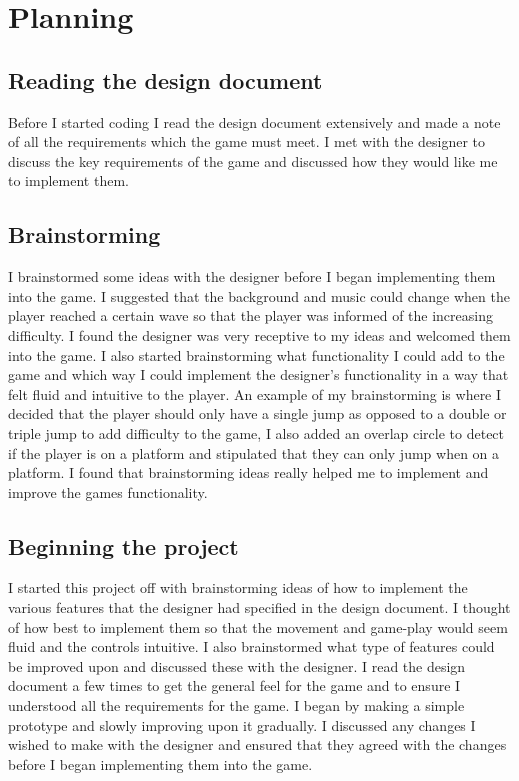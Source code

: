 \documentclass{report}
\begin{document}
\chapter{Planning}
\section{Reading the design document}
Before I started coding I read the design document extensively and made a note of all the requirements which the game must meet.  I met with the designer to discuss the key requirements of the game and discussed how they would like me to implement them.
\section{Brainstorming}
I brainstormed some ideas with the designer before I began implementing them into the game.  I suggested that the background and music could change when the player reached a certain wave so that the player was informed of the increasing difficulty.  I found the designer was very receptive to my ideas and welcomed them into the game. I also started brainstorming what functionality I could add to the game and which way I could implement the designer's functionality in a way that felt fluid and intuitive to the player.  An example of my brainstorming is where I decided that the player should only have a single jump as opposed to a double or triple jump to add difficulty to the game, I also added an overlap circle to detect if the player is on a platform and stipulated that they can only jump when on a platform.  I found that brainstorming ideas really helped me to implement and improve the games functionality. 
\section{Beginning the project}
I started this project off with brainstorming ideas of how to implement the various features that the designer had specified in the design document. I thought of how best to implement them so that the movement and game-play would seem fluid and the controls intuitive. I also brainstormed what type of features could be improved upon and discussed these with the designer. I read the design document a few times to get the general feel for the game and to ensure I understood all the requirements for the game.  I began by making a simple prototype and slowly improving upon it gradually.  I discussed any changes I wished to make with the designer and ensured that they agreed with the changes before I began implementing them into the game.
\end{document}
